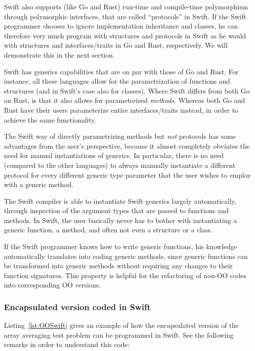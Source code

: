 \documentclass[11pt,oneside]{article}
\begin{document}
Swift also supports (like Go and Rust) run-time and compile-time
polymorphism through polymorphic interfaces, that are called
``protocols'' in Swift. If the Swift programmer chooses to ignore
implementation inheritance and classes, he can therefore very much
program with structures and protocols in Swift as he would with
structures and interfaces/traits in Go and Rust, respectively. We will
demonstrate this in the next section.

Swift has generics capabilities that are on par with those of Go and
Rust. For instance, all these languages allow for the parametrization
of functions and structures (and in Swift's case also for
classes). Where Swift differs from both Go an Rust, is that it also
allows for parameterized \emph{methods}. Whereas both Go and Rust have
their users parameterize entire interfaces/traits instead, in order to
achieve the same functionality.

The Swift way of directly parametrizing methods but \emph{not}
protocols has some advantages from the user's perspective, because it
almost completely obviates the need for manual instantiations of
generics. In particular, there is no need (compared to the other
languages) to always manually instantiate a different protocol for
every different generic type parameter that the user wishes to employ
with a generic method.

The Swift compiler is able to instantiate Swift generics largely
automatically, through inspection of the argument types that are
passed to functions and methods. In Swift, the user basically never
has to bother with instantiating a generic function, a method, and
often not even a structure or a class.

If the Swift programmer knows how to write generic functions, his
knowledge automatically translates into coding generic methods, since
generic functions can be transformed into generic methods without
requiring any changes to their function signatures. This property is
helpful for the refactoring of non-OO codes into corresponding OO
versions.

\subsubsection{Encapsulated version coded in Swift}

Listing~\ref{lst:OOSwift} gives an example of how the encapsulated
version of the array averaging test problem can be programmed in
Swift. See the following remarks in order to understand this code:
\end{document}
